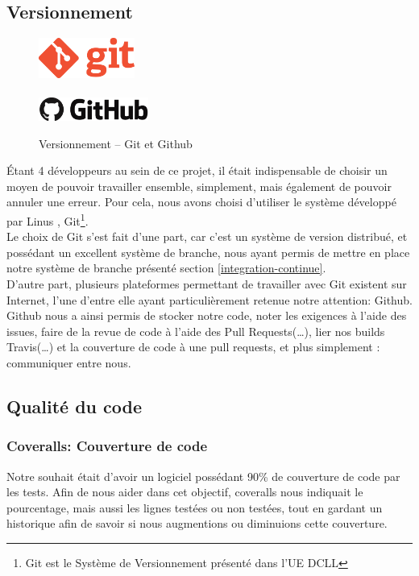\subsection{Versionnement}
\begin{figure}
\begin{center}
\includegraphics[width=0.28\textwidth]{../beamer/logos/git.png}\\~\\
\includegraphics[width=0.32\textwidth]{../beamer/logos/github.png}
\end{center}
\caption{Versionnement -- Git et Github}
\end{figure}
Étant 4 développeurs au sein de ce projet, il était indispensable de choisir un moyen de pouvoir travailler ensemble, simplement, mais
également de pouvoir annuler une erreur. Pour cela, nous avons choisi d'utiliser le système développé par Linus , Git\footnote{Git
est le Système de Versionnement présenté dans l'UE DCLL}.\\
Le choix de Git s'est fait d'une part, car c'est un système de version distribué, et possédant un excellent système de branche, nous ayant
permis de mettre en place notre système de branche présenté section \ref{integration-continue}.\\
D'autre part, plusieurs plateformes
permettant de travailler avec Git existent sur Internet, l'une d'entre elle ayant particulièrement retenue notre attention: Github.\\
Github nous a ainsi permis de stocker notre code, noter les exigences à l'aide des issues, faire de la revue de code à l'aide des Pull
Requests(…), lier nos builds Travis(…) et la couverture de code à une pull requests, et plus simplement : communiquer entre nous.

\subsection{Qualité du code}
\subsubsection{Coveralls: Couverture de code}
Notre souhait était d'avoir un logiciel possédant 90\% de couverture de code par les tests. Afin de nous aider dans cet objectif, coveralls
nous indiquait le pourcentage, mais aussi les lignes testées ou non testées, tout en gardant un historique afin de savoir si nous
augmentions ou diminuions cette couverture.

